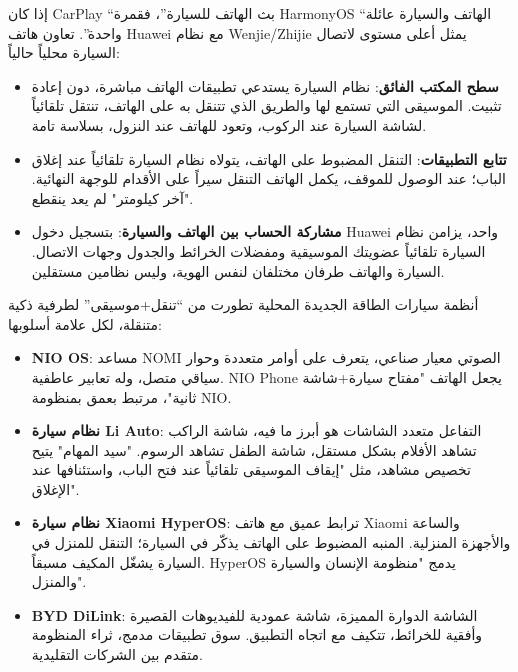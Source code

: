 
إذا كان CarPlay “بث الهاتف للسيارة”، فقمرة HarmonyOS “الهاتف والسيارة عائلة واحدة”. تعاون هاتف Huawei مع نظام Wenjie/Zhijie يمثل أعلى مستوى لاتصال السيارة محلياً حالياً:

\begin{itemize}
  \item \textbf{سطح المكتب الفائق}: نظام السيارة يستدعي تطبيقات الهاتف مباشرة، دون إعادة تثبيت. الموسيقى التي تستمع لها والطريق الذي تتنقل به على الهاتف، تنتقل تلقائياً لشاشة السيارة عند الركوب، وتعود للهاتف عند النزول، بسلاسة تامة.
  \item \textbf{تتابع التطبيقات}: التنقل المضبوط على الهاتف، يتولاه نظام السيارة تلقائياً عند إغلاق الباب؛ عند الوصول للموقف، يكمل الهاتف التنقل سيراً على الأقدام للوجهة النهائية. "آخر كيلومتر" لم يعد ينقطع.
  \item \textbf{مشاركة الحساب بين الهاتف والسيارة}: بتسجيل دخول Huawei واحد، يزامن نظام السيارة تلقائياً عضويتك الموسيقية ومفضلات الخرائط والجدول وجهات الاتصال. السيارة والهاتف طرفان مختلفان لنفس الهوية، وليس نظامين مستقلين.
\end{itemize}


أنظمة سيارات الطاقة الجديدة المحلية تطورت من “تنقل+موسيقى” لطرفية ذكية متنقلة، لكل علامة أسلوبها:

\begin{itemize}
  \item \textbf{NIO OS}: مساعد NOMI الصوتي معيار صناعي، يتعرف على أوامر متعددة وحوار سياقي متصل، وله تعابير عاطفية. NIO Phone يجعل الهاتف "مفتاح سيارة+شاشة ثانية"، مرتبط بعمق بمنظومة NIO.
  \item \textbf{نظام سيارة Li Auto}: التفاعل متعدد الشاشات هو أبرز ما فيه، شاشة الراكب تشاهد الأفلام بشكل مستقل، شاشة الطفل تشاهد الرسوم. "سيد المهام" يتيح تخصيص مشاهد، مثل "إيقاف الموسيقى تلقائياً عند فتح الباب، واستئنافها عند الإغلاق".
  \item \textbf{نظام سيارة Xiaomi HyperOS}: ترابط عميق مع هاتف Xiaomi والساعة والأجهزة المنزلية. المنبه المضبوط على الهاتف يذكّر في السيارة؛ التنقل للمنزل في السيارة يشغّل المكيف مسبقاً. HyperOS يدمج "منظومة الإنسان والسيارة والمنزل".
  \item \textbf{BYD DiLink}: الشاشة الدوارة المميزة، شاشة عمودية للفيديوهات القصيرة وأفقية للخرائط، تتكيف مع اتجاه التطبيق. سوق تطبيقات مدمج، ثراء المنظومة متقدم بين الشركات التقليدية.
\end{itemize}

